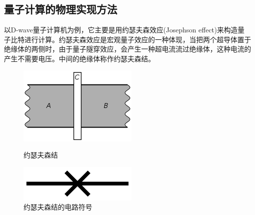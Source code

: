 \documentclass{article}
\begin{document}
\subsection{量子计算的物理实现方法}
\label{subsec:label}
以D-wave量子计算机为例，它主要是用约瑟夫森效应(Josephson effect)来构造量子比特进行计算。约瑟夫森效应是宏观量子效应的一种体现，当把两个超导体置于绝缘体的两侧时，由于量子隧穿效应，会产生一种超电流流过绝缘体，这种电流的产生不需要电压。中间的绝缘体称作约瑟夫森结。

\begin{figure}[htbp]
\centering
\begin{minipage}[t]{0.48\textwidth}
\centering
\includegraphics[width=0.4\linewidth]{figures/约瑟夫森结}
\caption{约瑟夫森结}
\end{minipage}
\begin{minipage}[t]{0.48\textwidth}
\centering
\includegraphics[width=0.4\linewidth]{figures/约瑟夫森结的电路符号}
\caption{约瑟夫森结的电路符号}
\end{minipage}
\end{figure}
\end{document}
